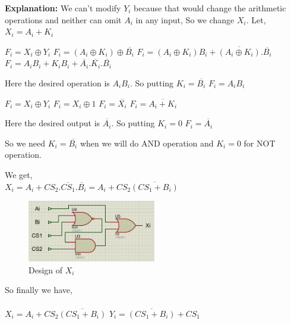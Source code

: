 \documentclass[]{article}
\begin{document}
	\noindent\textbf{Explanation:}
	We can't modify $Y_i$ because that would change the arithmetic operations
	and neither can omit $A_i$ in any input, So we change $X_i$.\newline
	Let,
    \\$X_i=A_i+K_i$ \newline
    
    \noindent$F_i=X_i \oplus Y_i$\newline
	$F_i=(A_i \oplus K_i) \oplus \overline{B_i}$\newline
	$F_i=(A_i \oplus K_i)B_i + \overline{(A_i \oplus K_i)} .\overline{B_i}$\newline
	$F_i=A_iB_i + K_iB_i + \overline{A_i}.\overline{K_i}.\overline{B_i}$ \newline 
	
	\noindent Here the desired operation is $A_iB_i$. So putting $K_i=\overline{B_i}$ \newline
	$F_i=A_iB_i$\newline
	
	\noindent$F_i=X_i \oplus Y_i$ \newline
	$F_i=X_i \oplus 1$ \newline
	$F_i=\overline{X_i}$ \newline
	$F_i=\overline{A_i+K_i}$\newline
	
	\noindent Here the desired output is $\overline{A_i}$. So putting $K_i=0$ \newline
	$F_i=\overline{A_i}$\newline
	
	\noindent So we need $K_i=\overline{B_i}$ when we will do AND operation and $K_i=0$ for NOT operation.
	
	\noindent We get, \newline\\
	$X_i=A_i+CS_2.\overline{CS_1}.\overline{B_i}=A_i+CS_2\overline{(CS_1+B_i)} $\newline
	
	\begin{figure}[h!]
		\centering
		\includegraphics[width = 0.5\textwidth]{Xi.PNG}
		\caption{Design of $X_i$ \newline
		}
		\label{fig:ckt2}
		
	\end{figure}
    \noindent So finally we have,\\\\
	$X_i=A_i+CS_2\overline{(CS_1+B_i)}$
	\newline
	\newline
    $Y_i = \overline{(CS_1+B_i)}+CS_1$
    
	
	
\end{document}
